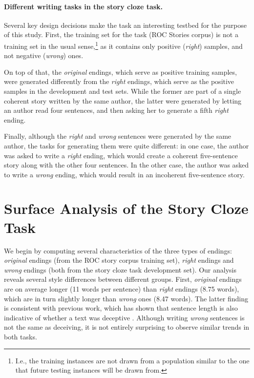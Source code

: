 \documentclass[11pt,a4paper]{article}
\newcommand{\isection}[2]{\section{#1}\label{ssec:#2}}
\begin{document}
\paragraph{Different writing tasks in the story cloze task.}
Several key design decisions make the task an interesting testbed for the purpose of this study.
First, the training set for the task (ROC Stories corpus) is not a
training set in the usual sense,\footnote{I.e., the training
  instances are not drawn from a population similar to the one that future
  testing instances will be drawn from.
}  as it contains only positive ({\it right}) samples, and not negative ({\it wrong}) ones. 

On top of that, the {\it original} endings, which serve as positive training samples, were generated differently from the {\it right} endings, which serve as the positive samples in the development and test sets. 
While the former are part of a single coherent story written by the same author, the latter were generated by letting an author read four sentences, 
and then asking her to generate a fifth {\it right} ending. 

Finally, although the {\it right} and {\it wrong} sentences were generated by the same author, 
the tasks for generating them were quite different: in one case, the author was asked to write a {\it right} ending, which would create a coherent five-sentence story along with the other four sentences. In the other case, the author was asked to write a {\it wrong} ending, which would result in an incoherent five-sentence story. 

\isection{Surface Analysis of the Story Cloze Task}{Surface}
We begin by computing several characteristics of the three types of endings: {\it original} endings (from the ROC story corpus training set), {\it right} endings and {\it wrong} endings (both from the story cloze task development set).
Our analysis  reveals several style differences between different groups. 
First, {\it original} endings are on average longer (11 words per
sentence) than {\it right} endings (8.75 words), which are in turn
slightly longer than {\it wrong} ones (8.47 words). 
The latter finding is consistent with previous work, which has shown that sentence length is also indicative of whether a text was deceptive \cite{qin2004exploratory,yancheva2013automatic}. 
Although writing {\it wrong} sentences is not the same as deceiving, it is not entirely surprising to observe similar trends in both tasks.
\end{document}
